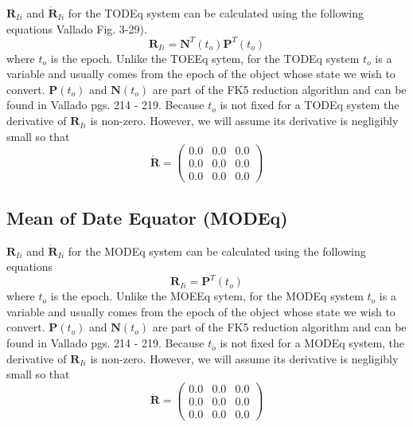 {$\mathbf{R}_{Ii}$ and $ \dot{\mathbf{R}}_{Ii}$ for the TODEq
system can be calculated using the following equations
Vallado\cite{vallado2} Fig. 3-29).
%
\begin{equation}
      \mathbf{R}_{Ii} = \mathbf{N}^T(t_o)\mathbf{P}^T(t_o)
\end{equation}
%
where $t_o$ is the epoch.  Unlike the TOEEq sytem, for the TODEq
system $t_o$ is a variable and usually comes from the epoch of the
object whose state we wish to convert.  $\mathbf{P}(t_o)$ and
$\mathbf{N}(t_o)$ are part of the FK5 reduction algorithm and can
be found in Vallado pgs. 214 - 219.  Because $t_o$ is not fixed
for a TODEq system the derivative of $\mathbf{R}_{Ii}$ is
non-zero. However, we will assume its derivative is negligibly
small so
   that
\begin{equation}
  \dot{\mathbf{R}} =   \begin{pmatrix}
     0.0 & 0.0 & 0.0\\
     0.0 & 0.0 & 0.0\\
     0.0 & 0.0 & 0.0
     \end{pmatrix}
\end{equation}

\subsection{Mean of Date Equator (MODEq)}
\label{Sec:MODEq} 

$\mathbf{R}_{Ii}$ and $ \dot{\mathbf{R}}_{Ii}$ for the MODEq
system can be calculated using the following equations
%
\begin{equation}
      \mathbf{R}_{Ii} = \mathbf{P}^T(t_o)
\end{equation}
%
where $t_o$ is the epoch.  Unlike the MOEEq sytem, for the MODEq
system $t_o$ is a variable and usually comes from the epoch of the
object whose state we wish to convert.  $\mathbf{P}(t_o)$ and
$\mathbf{N}(t_o)$ are part of the FK5 reduction algorithm and can
be found in Vallado\cite{vallado2} pgs. 214 - 219.  Because $t_o$
is not fixed for a  MODEq system, the derivative of
$\mathbf{R}_{Ii}$ is non-zero. However, we will assume its
derivative is negligibly small so that
\begin{equation}
  \dot{\mathbf{R}} =   \begin{pmatrix}
     0.0 & 0.0 & 0.0\\
     0.0 & 0.0 & 0.0\\
     0.0 & 0.0 & 0.0
     \end{pmatrix}
\end{equation}


}
